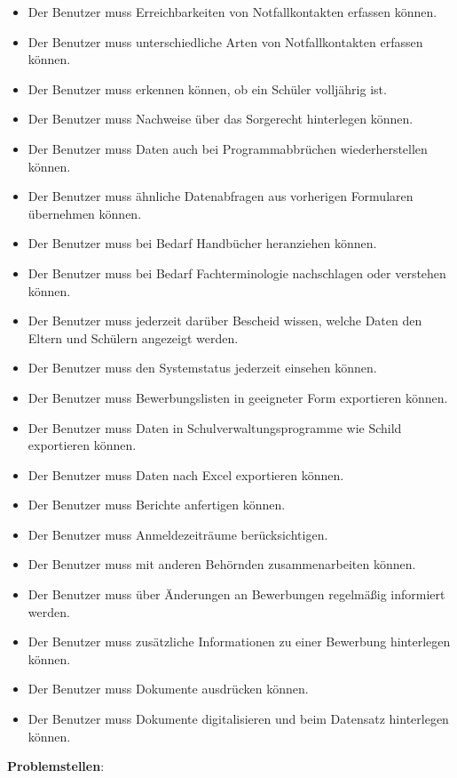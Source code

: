 \begin{itemize}
     \item Der Benutzer muss Erreichbarkeiten von Notfallkontakten erfassen können.
     \item Der Benutzer muss unterschiedliche Arten von Notfallkontakten erfassen können.
     \item Der Benutzer muss erkennen können, ob ein Schüler volljährig ist.
     \item Der Benutzer muss Nachweise über das Sorgerecht hinterlegen können.
     \item Der Benutzer muss Daten auch bei Programmabbrüchen wiederherstellen können.
     \item Der Benutzer muss ähnliche Datenabfragen aus vorherigen Formularen übernehmen können.
     \item Der Benutzer muss bei Bedarf Handbücher heranziehen können.
     \item Der Benutzer muss bei Bedarf Fachterminologie nachschlagen oder verstehen können.
     \item Der Benutzer muss jederzeit darüber Bescheid wissen, welche Daten den Eltern und Schülern angezeigt werden.
     \item Der Benutzer muss den Systemstatus jederzeit einsehen können.
     \item Der Benutzer muss Bewerbungslisten in geeigneter Form exportieren können.
     \item Der Benutzer muss Daten in Schulverwaltungsprogramme wie Schild exportieren können.
     \item Der Benutzer muss Daten nach Excel exportieren können.
     \item Der Benutzer muss Berichte anfertigen können.
     \item Der Benutzer muss Anmeldezeiträume berücksichtigen.
     \item Der Benutzer muss mit anderen Behörnden zusammenarbeiten können.
     \item Der Benutzer muss über Änderungen an Bewerbungen regelmäßig informiert werden.
     \item Der Benutzer muss zusätzliche Informationen zu einer Bewerbung hinterlegen können.
     \item Der Benutzer muss Dokumente ausdrücken können.
     \item Der Benutzer muss Dokumente digitalisieren und beim Datensatz hinterlegen können.
\end{itemize}

\textbf{Problemstellen}:

